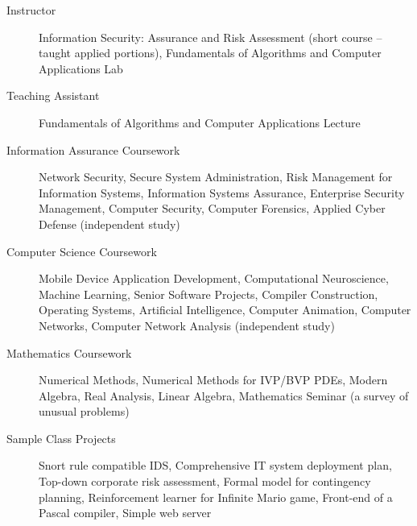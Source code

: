 \documentclass{resume}
\begin{document}
    \begin{description}
        \item[Instructor] Information Security: Assurance and Risk Assessment
        (short course -- taught applied portions), Fundamentals of Algorithms
        and Computer Applications Lab
        \item[Teaching Assistant] Fundamentals of Algorithms and Computer
        Applications Lecture
        \item[Information Assurance Coursework] Network Security, Secure
        System Administration, Risk Management for Information Systems,
        Information Systems Assurance, Enterprise Security Management,
        Computer Security, Computer Forensics, Applied Cyber Defense
        (independent study)
        \item[Computer Science Coursework] Mobile Device Application Development,
        Computational Neuroscience, Machine
        Learning, Senior Software Projects, Compiler Construction, Operating
        Systems, Artificial Intelligence, Computer Animation, Computer Networks,
        Computer Network Analysis (independent study)
        \item[Mathematics Coursework] Numerical Methods, Numerical Methods for
        IVP/BVP PDEs, Modern Algebra, Real Analysis, Linear Algebra, Mathematics
        Seminar (a survey of unusual problems)
        \item[Sample Class Projects] Snort rule compatible IDS,
        Comprehensive IT system deployment plan,
        Top-down corporate risk assessment, Formal model for contingency planning,
        Reinforcement learner for Infinite Mario game, Front-end of a Pascal
        compiler, Simple web server
    \end{description}
\end{document}
